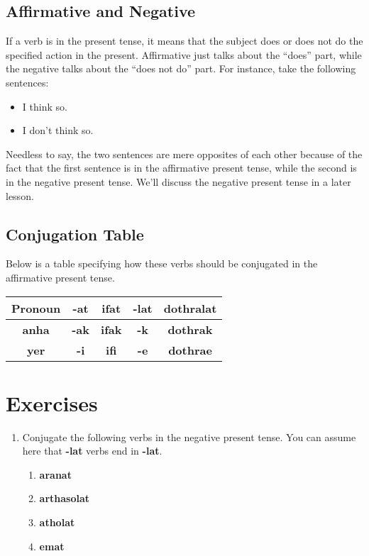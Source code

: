 \subsection*{Affirmative and Negative}
If a verb is in the present tense, it means that the subject does or does not do the specified action in the present.
Affirmative just talks about the ``does'' part, while the negative talks about the ``does not do'' part. For instance,
take the following sentences:
\begin{itemize}
	\item I think so.
	\item I don't think so.
\end{itemize}
Needless to say, the two sentences are mere opposites of each other because of the fact that the first sentence is in
the affirmative present tense, while the second is in the negative present tense. We'll discuss the negative present
tense in a later lesson.
\subsection*{Conjugation Table}
Below is a table specifying how these verbs should be conjugated in the affirmative present tense. \\
\begin{tabular}{|c|c|c|c|c|}
		\hline
		Pronoun & \textbf{-at} & \textbf{ifat} & \textbf{-lat} & \textbf{dothralat} \\
		\hline
		\textbf{anha} & \textbf{-ak} & \textbf{ifak} & \textbf{-k} & \textbf{dothrak} \\
		\hline
		\textbf{yer} & \textbf{-i} & \textbf{ifi} & \textbf{-e} & \textbf{dothrae} \\
		\hline
\end{tabular}
\section*{Exercises}
\begin{enumerate}
	\item Conjugate the following verbs in the negative present tense. You can assume here that
\textbf{-lat} verbs end in \textbf{-lat}.
	\begin{enumerate}
		\item \textbf{aranat}
		\item \textbf{arthasolat}
		\item \textbf{atholat}
		\item \textbf{emat}
	\end{enumerate}
\end{enumerate}
